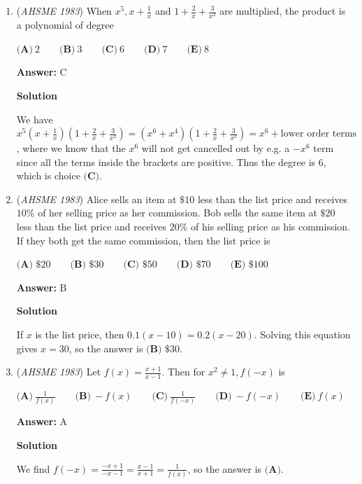 \begin{enumerate}
 


	\item (\textit{AHSME 1983}) When $x^5, x+\frac{1}{x}$ and $1+\frac{2}{x} + \frac{3}{x^2}$ are multiplied, the product is a polynomial of degree


 $\textbf{(A)}\ 2\qquad \textbf{(B)}\ 3\qquad \textbf{(C)}\ 6\qquad \textbf{(D)}\ 7\qquad \textbf{(E)}\ 8$

 \textbf{Answer: }C



\textbf{Solution}

We have $x^5\left(x+\frac{1}{x}\right)\left(1+\frac{2}{x}+\frac{3}{x^2}\right) = (x^6+x^4)\left(1+\frac{2}{x}+\frac{3}{x^2}\right) = x^6 + \text{lower order terms}$, where we know that the $x^6$ will not get cancelled out by e.g. a $-x^6$ term since all the terms inside the brackets are positive. Thus the degree is $6$, which is choice $\boxed{\textbf{(C)}}$.

 


	\item (\textit{AHSME 1983}) Alice sells an item at $\$10$ less than the list price and receives $10\%$ of her selling price as her commission. 
Bob sells the same item at $\$20$ less than the list price and receives $20\%$ of his selling price as his commission. 
If they both get the same commission, then the list price is


 $\textbf{(A) } \$20\qquad \textbf{(B) } \$30\qquad \textbf{(C) } \$50\qquad \textbf{(D) } \$70\qquad \textbf{(E) } \$100$

 \textbf{Answer: }B



\textbf{Solution}

If $x$ is the list price, then $0.1(x-10)=0.2(x-20)$. Solving this equation gives $x=30$, so the answer is $\boxed{\textbf{(B) }\$30}$.

 


	\item (\textit{AHSME 1983}) Let $f(x) = \frac{x+1}{x-1}$. Then for $x^2 \neq 1, f(-x)$ is


 $\textbf{(A)}\ \frac{1}{f(x)}\qquad \textbf{(B)}\ -f(x)\qquad \textbf{(C)}\ \frac{1}{f(-x)}\qquad \textbf{(D)}\ -f(-x)\qquad \textbf{(E)}\ f(x)$

 \textbf{Answer: }A



\textbf{Solution}

We find $f(-x) = \frac{-x+1}{-x-1} = \frac{x-1}{x+1} = \frac{1}{f(x)}$, so the answer is $\boxed{\textbf{(A)}}$.


\end{enumerate}
